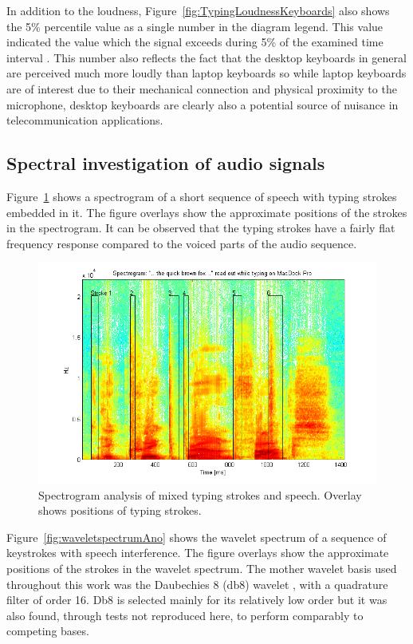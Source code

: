 In addition to the loudness, Figure~\ref{fig:TypingLoudnessKeyboards} also shows the 5\% percentile value as a single number in the diagram legend. This value indicated the value which the signal exceeds during 5\% of the examined time interval \cite{Hauswirth2013}. This number also reflects the fact that the desktop keyboards in general are perceived much more loudly than laptop keyboards so while laptop keyboards are of interest due to their mechanical connection and physical proximity to the microphone, desktop keyboards are clearly also a potential source of nuisance in telecommunication applications.

\subsection{Spectral investigation of audio signals}
Figure~\ref{fig:spectrogramMarkedTapsBrownFox} shows a spectrogram of a short sequence of speech with typing strokes embedded in it. The figure overlays show the approximate positions of the strokes in the spectrogram. It can be observed that the typing strokes have a fairly flat frequency response compared to the voiced parts of the audio sequence.

\begin{figure}[!] %
\centering
\includegraphics[width=150mm]{spectrogramMarkedTapsBrownFox.png}
\caption{Spectrogram analysis of mixed typing strokes and speech. Overlay shows positions of typing strokes.}\label{fig:spectrogramMarkedTapsBrownFox}
\end{figure}

Figure~\ref{fig:waveletspectrumAno} shows the wavelet spectrum of a sequence of keystrokes with speech interference. The figure overlays show the approximate positions of the strokes in the wavelet spectrum. \label{corrections:motherWavelet}The mother wavelet basis used throughout this work was the Daubechies 8 (db8) wavelet \cite{Daubechies1992}, with a quadrature filter of order 16. Db8 is selected mainly for its relatively low order but it was also found, through tests not reproduced here, to perform comparably to competing bases.

